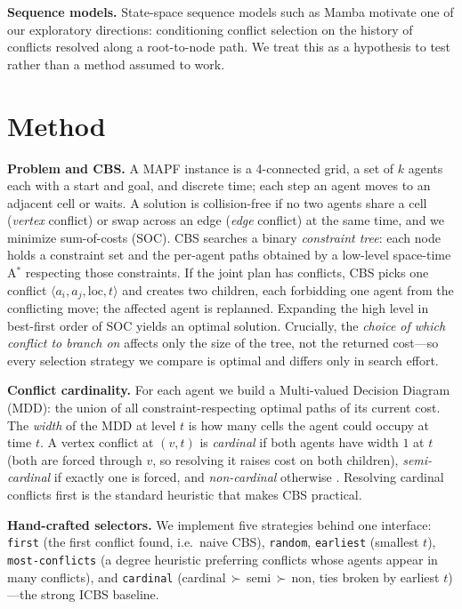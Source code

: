 \documentclass{article}
\theoremstyle{plain}
\theoremstyle{definition}
\theoremstyle{remark}
\begin{document}
\textbf{Sequence models. }State-space sequence models such as Mamba \cite{gu2023mamba} motivate one of our exploratory directions: conditioning conflict selection on the history of conflicts resolved along a root-to-node path. We treat this as a hypothesis to test rather than a method assumed to work.
\vspace{-10pt}
\section{Method}
\vspace{-6pt}

\textbf{Problem and CBS.} A MAPF instance is a 4-connected grid, a set of $k$
agents each with a start and goal, and discrete time; each step an agent moves to
an adjacent cell or waits. A solution is collision-free if no two agents share a
cell (\emph{vertex} conflict) or swap across an edge (\emph{edge} conflict) at the
same time, and we minimize sum-of-costs (SOC). CBS \cite{sharon2015conflict}
searches a binary \emph{constraint tree}: each node holds a constraint set and the
per-agent paths obtained by a low-level space-time A$^\ast$ respecting those
constraints. If the joint plan has conflicts, CBS picks one conflict
$\langle a_i,a_j,\text{loc},t\rangle$ and creates two children, each forbidding one
agent from the conflicting move; the affected agent is replanned. Expanding the
high level in best-first order of SOC yields an optimal solution. Crucially, the
\emph{choice of which conflict to branch on} affects only the size of the tree,
not the returned cost---so every selection strategy we compare is optimal and
differs only in search effort.

\textbf{Conflict cardinality.} For each agent we build a Multi-valued Decision
Diagram (MDD): the union of all constraint-respecting optimal paths of its current
cost. The \emph{width} of the MDD at level $t$ is how many cells the agent could
occupy at time $t$. A vertex conflict at $(v,t)$ is \emph{cardinal} if both agents
have width $1$ at $t$ (both are forced through $v$, so resolving it raises cost on
both children), \emph{semi-cardinal} if exactly one is forced, and
\emph{non-cardinal} otherwise \cite{boyarski2015icbs}. Resolving cardinal
conflicts first is the standard heuristic that makes CBS practical.

\textbf{Hand-crafted selectors.} We implement five strategies behind one
interface: \texttt{first} (the first conflict found, i.e.\ naive CBS),
\texttt{random}, \texttt{earliest} (smallest $t$), \texttt{most-conflicts} (a
degree heuristic preferring conflicts whose agents appear in many conflicts), and
\texttt{cardinal} (cardinal\,$\succ$\,semi\,$\succ$\,non, ties broken by earliest
$t$)---the strong ICBS baseline.
\end{document}
